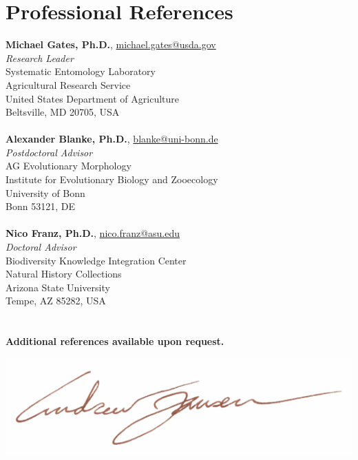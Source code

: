 \documentclass[12pt,a4paper]{article}
\begin{document}
\section*{Professional References}
	\textbf{Michael Gates, Ph.D.}, \href{mailto:michael.gates@usda.gov}{michael.gates@usda.gov}\\
	\textit{Research Leader}\\
	Systematic Entomology Laboratory\\
	Agricultural Research Service\\
	United States Department of Agriculture\\
	Beltsville, MD 20705, USA\\
	\\
	\textbf{Alexander Blanke, Ph.D.}, \href{mailto:blanke@uni-bonn.de}{blanke@uni-bonn.de}\\
	\textit{Postdoctoral Advisor}\\
	AG Evolutionary Morphology\\
	Institute for Evolutionary Biology and Zooecology\\
	University of Bonn\\
	Bonn 53121, DE\\
	\\
	\textbf{Nico Franz, Ph.D.}, \href{mailto:nico.franz@asu.edu}{nico.franz@asu.edu}\\
	\textit{Doctoral Advisor}\\
	Biodiversity Knowledge Integration Center\\
	Natural History Collections\\
	Arizona State University\\
	Tempe, AZ 85282, USA\\
	\\
	\\
	\textbf{Additional references available upon request.}

\vspace*{0.25cm}
\includegraphics[scale=1]{signature.pdf}\\
\end{document}
